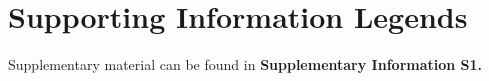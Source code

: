 \section*{Supporting Information Legends}

Supplementary material can be found in {\bf Supplementary Information S1.}